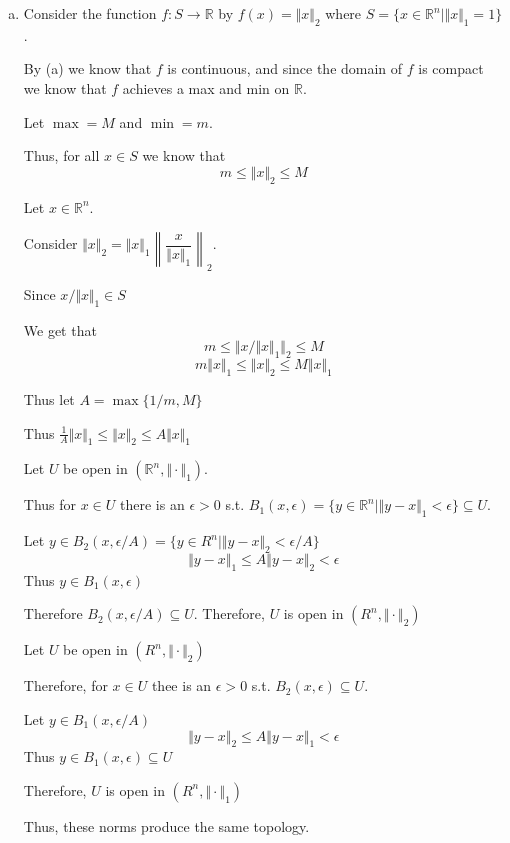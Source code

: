 \documentclass[12pt, letterpaper]{article}
\newcommand{\R}{\mathbb{R}}
\begin{document}
\begin{enumerate}[(a)]
    \item Consider the function $f: S \to \R$ by $f(x)=\Vert x \Vert_2$ where $S=\{x \in \R^n \mid \Vert x \Vert_1 = 1\}$.
    
    By (a) we know that $f$ is continuous, and since the domain of $f$ is compact we know that $f$ achieves a max and min on $\R$.

    Let $\max=M$ and $\min=m$.

    Thus, for all $x \in S$ we know that
    \[m \leq \Vert x \Vert_2 \leq M\]

    Let $x\in \R^n$.

    Consider $\Vert x \Vert_2=\Vert x \Vert_1 \left\lVert \dfrac{x}{\Vert x \Vert_1} \right\rVert_2$.

    Since $x /\Vert x \Vert_1\in S$

    We get that
    \[m \leq \Vert x / \Vert x \Vert_1 \Vert_2 \leq M\]
    \[m\Vert x \Vert_1 \leq \Vert x \Vert_2 \leq M \Vert x \Vert_1\]

    Thus let $A=\max\{1/m, M\}$

    Thus $\frac{1}{A}\Vert x \Vert_1 \leq \Vert x \Vert_2 \leq A\Vert x \Vert_1$

    Let $U$ be open in $(\R^n, \Vert \cdot \Vert_1)$.

    Thus for $x \in U$ there is an $\epsilon > 0$ s.t. $B_1(x,\epsilon)=\{y \in \R^n \mid \Vert y -x \Vert_1 < \epsilon\} \subseteq U$.

    Let $y \in B_2(x,\epsilon/A)=\{y \in R^n \mid \Vert y-x \Vert_2 < \epsilon/A\}$
    \[\Vert y-x \Vert_1 \leq A\Vert y-x \Vert_2 < \epsilon\]
    Thus $y \in B_1(x,\epsilon)$

    Therefore $B_2(x,\epsilon/A) \subseteq U$. Therefore, $U$ is open in $(R^n, \Vert \cdot \Vert_2)$

    Let $U$ be open in $(R^n, \Vert \cdot \Vert_2)$
    
    Therefore, for $x \in U$ thee is an $\epsilon > 0$ s.t. $B_2(x,\epsilon) \subseteq U$.

    Let $y \in B_1(x,\epsilon/A)$
    \[\Vert y-x \Vert_2 \leq A \Vert y-x \Vert_1 < \epsilon\]
    Thus $y \in B_1(x,\epsilon) \subseteq U$

    Therefore, $U$ is open in $(R^n,\Vert \cdot \Vert_1)$

    Thus, these norms produce the same topology.
\end{enumerate}
\end{document}
